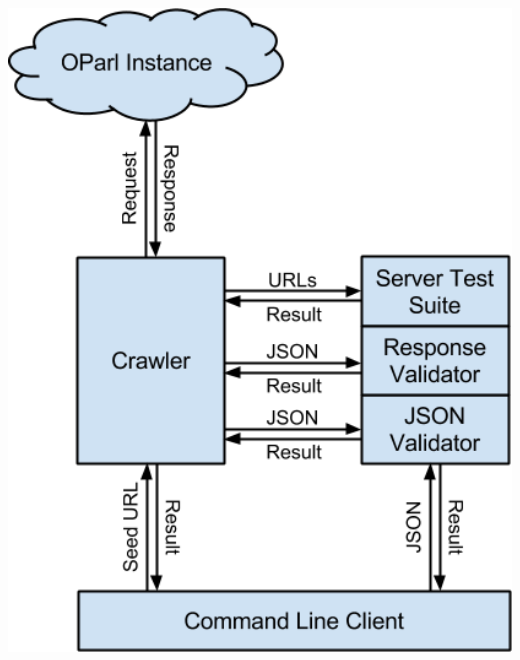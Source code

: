 \documentclass{beamer}
\begin{document}
{\begin{columns}
\begin{column}{.4\textwidth}
            \includegraphics[width=1.2\textwidth]{architecture.final.png}
        \end{column}
    \end{columns}
}
\end{document}

